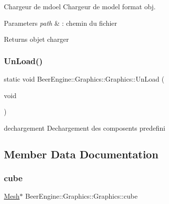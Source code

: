 Chargeur de mdoel Chargeur de model format obj. 


\begin{DoxyParams}{Parameters}
{\em path} & \+: chemin du fichier \\
\hline
\end{DoxyParams}
\begin{DoxyReturn}{Returns}
objet charger 
\end{DoxyReturn}
\mbox{\label{class_beer_engine_1_1_graphics_1_1_graphics_ab42d214b5a3f69614ad5b9c30d506619}} 
\subsubsection{\texorpdfstring{Un\+Load()}{UnLoad()}}
{\footnotesize\ttfamily static void Beer\+Engine\+::\+Graphics\+::\+Graphics\+::\+Un\+Load (\begin{DoxyParamCaption}\item[{void}]{ }\end{DoxyParamCaption})\hspace{0.3cm}{\ttfamily [static]}}



dechargement Dechargement des composents predefini 



\subsection{Member Data Documentation}
\mbox{\label{class_beer_engine_1_1_graphics_1_1_graphics_a291e41114824803286b61444d51dbbed}} 
\subsubsection{\texorpdfstring{cube}{cube}}
{\footnotesize\ttfamily \mbox{\hyperlink{class_beer_engine_1_1_graphics_1_1_mesh}{Mesh}}$\ast$ Beer\+Engine\+::\+Graphics\+::\+Graphics\+::cube\hspace{0.3cm}{\ttfamily [static]}}

